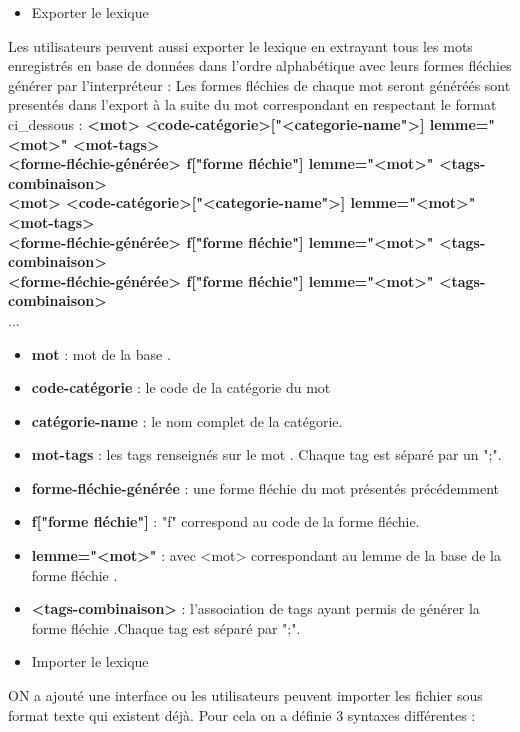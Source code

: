 \documentclass[12pt,a4paper]{article}
\begin{document}
\begin{itemize}  
  \item Exporter le lexique
\end{itemize}
Les utilisateurs peuvent aussi exporter le lexique en extrayant tous les mots enregistrés en base de données dans l'ordre alphabétique avec leurs formes fléchies générer par l'interpréteur :
Les formes fléchies de chaque mot seront généréés sont presentés dans l'export à la suite du mot correspondant en respectant le format ci_dessous :
\textbf{<mot> <code-catégorie>["<categorie-name">] lemme="<mot>" {<mot-tags>}} \\
\textbf{<forme-fléchie-générée>  f["forme fléchie"] lemme="<mot>" {<tags-combinaison>}}\\
\textbf{<mot> <code-catégorie>["<categorie-name">] lemme="<mot>" {<mot-tags>}} \\
\textbf{<forme-fléchie-générée>  f["forme fléchie"] lemme="<mot>" {<tags-combinaison>}}\\
\textbf{<forme-fléchie-générée>  f["forme fléchie"] lemme="<mot>" {<tags-combinaison>}}\\
...

\begin{itemize}  
\item \textbf{mot} : mot de la base .
\item \textbf{code-catégorie} : le code de la catégorie du mot 
\item \textbf{catégorie-name} : le nom complet de la catégorie.
\item \textbf{mot-tags} : les tags renseignés sur le mot . Chaque tag est séparé par un ";".
\item \textbf{forme-fléchie-générée} : une forme fléchie du mot présentés précédemment
\item \textbf{f["forme fléchie"]} : "f" correspond au code de la forme fléchie. 
\item \textbf{lemme="<mot>"} : avec <mot> correspondant au lemme de la base de la forme fléchie .
\item \textbf{<tags-combinaison>} : l'association de tags ayant permis de générer la forme fléchie .Chaque tag est séparé par ";".
\end{itemize}

\begin{itemize}  
  \item Importer le lexique
\end{itemize}
ON a ajouté une interface ou les utilisateurs peuvent importer les fichier sous format texte qui existent déjà. Pour cela on a définie 3 syntaxes différentes : 
\end{document}
